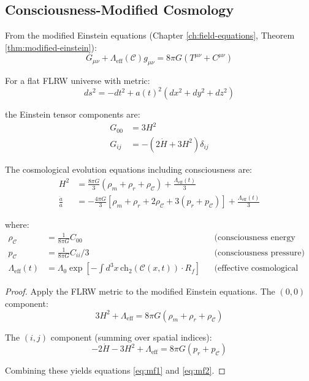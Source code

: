 \subsection{Consciousness-Modified Cosmology}

From the modified Einstein equations (Chapter \ref{ch:field-equations}, Theorem \ref{thm:modified-einstein}):
\begin{equation}
G_{\mu\nu} + \Lambda_{\text{eff}}(\mathcal{C}) g_{\mu\nu} = 8\pi G (T^{\mu\nu} + C^{\mu\nu})
\end{equation}

For a flat FLRW universe with metric:
\begin{equation}
ds^2 = -dt^2 + a(t)^2 (dx^2 + dy^2 + dz^2)
\end{equation}

the Einstein tensor components are:
\begin{align}
G_{00} &= 3H^2 \\
G_{ij} &= -(2\dot{H} + 3H^2) \delta_{ij}
\end{align}

\begin{theorem}\label{thm:modified-friedmann}
The cosmological evolution equations including consciousness are:
\begin{align}
H^2 &= \frac{8\pi G}{3} \left( \rho_m + \rho_r + \rho_{\mathcal{C}} \right) + \frac{\Lambda_{\text{eff}}(t)}{3} \label{eq:mf1} \\
\frac{\ddot{a}}{a} &= -\frac{4\pi G}{3} \left[ \rho_m + \rho_r + 2\rho_{\mathcal{C}} + 3(p_r + p_{\mathcal{C}}) \right] + \frac{\Lambda_{\text{eff}}(t)}{3} \label{eq:mf2}
\end{align}

where:
\begin{align}
\rho_{\mathcal{C}} &= \frac{1}{8\pi G} C_{00} && \text{(consciousness energy density)} \\
p_{\mathcal{C}} &= \frac{1}{8\pi G} C_{ii} / 3 && \text{(consciousness pressure)} \\
\Lambda_{\text{eff}}(t) &= \Lambda_0 \exp\left[ -\int d^3x \, \text{ch}_2(\mathcal{C}(x,t)) \cdot R_f \right] && \text{(effective cosmological constant)}
\end{align}
\end{theorem}

\begin{proof}
Apply the FLRW metric to the modified Einstein equations. The $(0,0)$ component:
\begin{equation}
3H^2 + \Lambda_{\text{eff}} = 8\pi G (\rho_m + \rho_r + \rho_{\mathcal{C}})
\end{equation}

The $(i,j)$ component (summing over spatial indices):
\begin{equation}
-2\dot{H} - 3H^2 + \Lambda_{\text{eff}} = 8\pi G (p_r + p_{\mathcal{C}})
\end{equation}

Combining these yields equations \eqref{eq:mf1} and \eqref{eq:mf2}.
\end{proof}

